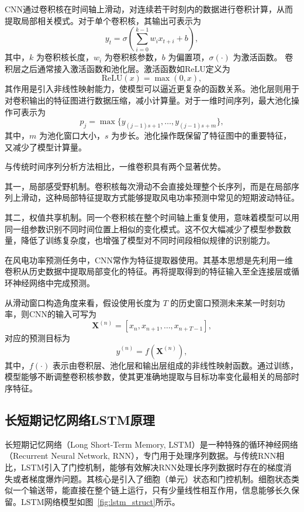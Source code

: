 CNN通过卷积核在时间轴上滑动，对连续若干时刻内的数据进行卷积计算，从而提取局部相关模式。对于单个卷积核，其输出可表示为
\begin{equation}
\label{eq:cnn_conv}
y_t=\sigma\left(\sum_{i=0}^{k-1} w_i x_{t+i}+b\right),
\end{equation}
其中，$k$ 为卷积核长度，$w_i$ 为卷积核参数，$b$ 为偏置项，$\sigma(\cdot)$ 为激活函数。
卷积层之后通常接入激活函数和池化层。激活函数如ReLU定义为
\begin{equation}
\label{eq:cnn_relu}
\mathrm{ReLU}(x)=\max(0,x),
\end{equation}
其作用是引入非线性映射能力，使模型可以逼近更复杂的函数关系。池化层则用于对卷积输出的特征图进行数据压缩，减小计算量。对于一维时间序列，最大池化操作可表示为
\begin{equation}
\label{eq:cnn_maxpool}
p_j=\max \{ y_{(j-1)s+1},\dots,y_{(j-1)s+m} \},
\end{equation}
其中，$m$ 为池化窗口大小，$s$ 为步长。池化操作既保留了特征图中的重要特征，又减少了模型计算量。

与传统时间序列分析方法相比，一维卷积具有两个显著优势。

其一，局部感受野机制。卷积核每次滑动不会直接处理整个长序列，而是在局部序列上滑动，这种局部特征提取方式能够提取风电功率预测中常见的短期波动特征。

其二，权值共享机制。同一个卷积核在整个时间轴上重复使用，意味着模型可以用同一组参数识别不同时间位置上相似的变化模式。这不仅大幅减少了模型参数数量，降低了训练复杂度，也增强了模型对不同时间段相似规律的识别能力。

在风电功率预测任务中，CNN常作为特征提取器使用。其基本思想是先利用一维卷积从历史数据中提取局部变化的特征。再将提取得到的特征输入至全连接层或循环神经网络中完成预测。

从滑动窗口构造角度来看，假设使用长度为 $T$ 的历史窗口预测未来某一时刻功率，则CNN的输入可写为
\begin{equation}
\label{eq:cnn_window_input}
\mathbf{X}^{(n)}=[x_n,x_{n+1},\dots,x_{n+T-1}],
\end{equation}
对应的预测目标为
\begin{equation}
\label{eq:cnn_output}
\hat{y}^{(n)}=f(\mathbf{X}^{(n)}),
\end{equation}
其中，$f(\cdot)$ 表示由卷积层、池化层和输出层组成的非线性映射函数。通过训练，模型能够不断调整卷积核参数，使其更准确地提取与目标功率变化最相关的局部时序特征。

\subsection{长短期记忆网络LSTM原理}
长短期记忆网络（Long Short-Term Memory, LSTM）是一种特殊的循环神经网络（Recurrent Neural Network, RNN），专门用于处理序列数据\cite{zhang_short-term_2019,__2017}。与传统RNN相比，LSTM引入了门控机制，能够有效解决RNN处理长序列数据时存在的梯度消失或者梯度爆炸问题。其核心是引入了细胞（单元）状态和门控机制。细胞状态类似一个输送带，能直接在整个链上运行，只有少量线性相互作用，信息能够长久保留。LSTM网络模型如图~\ref{fig:lstm_struct}所示。


